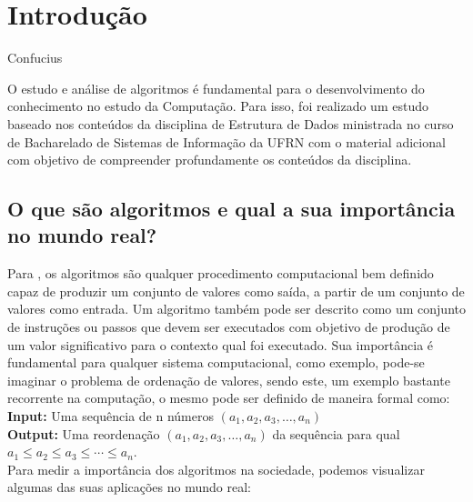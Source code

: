 
\chapter{Introdução}
\label{cap:1:intro}

{Confucius}


O estudo e análise de algoritmos é fundamental para o desenvolvimento do conhecimento
no estudo da Computação. Para isso, foi realizado um estudo baseado nos conteúdos
da disciplina de Estrutura de Dados ministrada no curso de Bacharelado de Sistemas
de Informação da UFRN com o material adicional \cite{cormen2022algorithms} com objetivo de
compreender profundamente os conteúdos da disciplina.

\section{O que são algoritmos e qual a sua importância no mundo real?}

Para \cite{cormen2022algorithms}, os algoritmos são qualquer procedimento computacional bem
definido capaz de produzir um conjunto de valores como saída, a partir de um conjunto de valores
como entrada. Um algoritmo também pode ser descrito como um conjunto de instruções ou passos que
devem ser executados com objetivo de produção de um valor significativo para o contexto qual foi
executado. Sua importância é fundamental para qualquer sistema computacional, como exemplo, pode-se
imaginar o problema de ordenação de valores, sendo este, um exemplo bastante recorrente na computação,
o mesmo pode ser definido de maneira formal como: \\

\textbf{Input: } Uma sequência de n números $(a_1, a_2, a_3,\ldots, a_n)$ \\

\textbf{Output: } Uma reordenação $(a_1, a_2, a_3,\ldots, a_n)$ da sequência para qual \\
$a_1 \leq a_2 \leq a_3 \leq \cdots \leq a_n$. \\

Para medir a importância dos algoritmos na sociedade, podemos visualizar algumas das suas aplicações no mundo
real:


